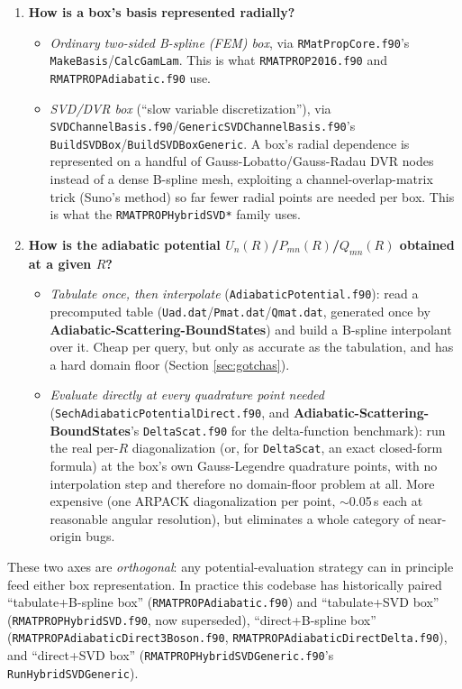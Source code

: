 \documentclass[11pt]{article}
\newcommand{\file}[1]{\texttt{#1}}
\newcommand{\sub}[1]{\texttt{#1}}
\newcommand{\repo}[1]{\textbf{#1}}
\begin{document}
\begin{enumerate}
\item \textbf{How is a box's basis represented radially?}
  \begin{itemize}
    \item \emph{Ordinary two-sided B-spline (FEM) box}, via \file{RMatPropCore.f90}'s
      \sub{MakeBasis}/\sub{CalcGamLam}. This is what \file{RMATPROP2016.f90} and
      \file{RMATPROPAdiabatic.f90} use.
    \item \emph{SVD/DVR box} (``slow variable discretization''), via
      \file{SVDChannelBasis.f90}/\file{GenericSVDChannelBasis.f90}'s
      \sub{BuildSVDBox}/\sub{BuildSVDBoxGeneric}. A box's radial dependence is represented on a
      handful of Gauss-Lobatto/Gauss-Radau DVR nodes instead of a dense B-spline mesh, exploiting
      a channel-overlap-matrix trick (Suno's method) so far fewer radial points are needed per
      box. This is what the \file{RMATPROPHybridSVD*} family uses.
  \end{itemize}
\item \textbf{How is the adiabatic potential $U_n(R)$/$P_{mn}(R)$/$Q_{mn}(R)$ obtained at a
  given $R$?}
  \begin{itemize}
    \item \emph{Tabulate once, then interpolate} (\file{AdiabaticPotential.f90}): read a
      precomputed table (\file{Uad.dat}/\file{Pmat.dat}/\file{Qmat.dat}, generated once by
      \repo{Adiabatic-Scattering-BoundStates}) and build a B-spline interpolant over it. Cheap
      per query, but only as accurate as the tabulation, and has a hard domain floor (Section
      \ref{sec:gotchas}).
    \item \emph{Evaluate directly at every quadrature point needed}
      (\file{SechAdiabaticPotentialDirect.f90}, and \repo{Adiabatic-Scattering-BoundStates}'s
      \file{DeltaScat.f90} for the delta-function benchmark): run the real per-$R$ diagonalization
      (or, for \file{DeltaScat}, an exact closed-form formula) at the box's own Gauss-Legendre
      quadrature points, with no interpolation step and therefore no domain-floor problem at all.
      More expensive (one ARPACK diagonalization per point, $\sim$0.05\,s each at reasonable
      angular resolution), but eliminates a whole category of near-origin bugs.
  \end{itemize}
\end{enumerate}

These two axes are \emph{orthogonal}: any potential-evaluation strategy can in principle feed
either box representation. In practice this codebase has historically paired ``tabulate+B-spline
box'' (\file{RMATPROPAdiabatic.f90}) and ``tabulate+SVD box''
(\file{RMATPROPHybridSVD.f90}, now superseded), ``direct+B-spline box''
(\file{RMATPROPAdiabaticDirect3Boson.f90}, \file{RMATPROPAdiabaticDirectDelta.f90}), and
``direct+SVD box''
(\file{RMATPROPHybridSVDGeneric.f90}'s \sub{RunHybridSVDGeneric}).
\end{document}
